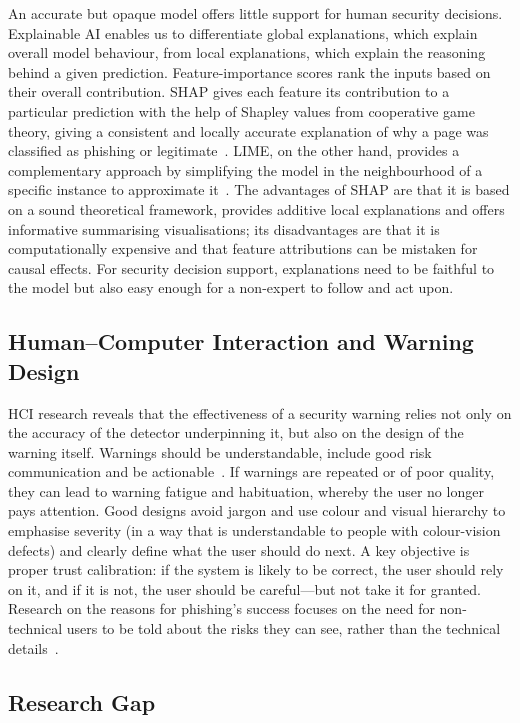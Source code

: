 \documentclass[11pt,a4paper]{article}
\begin{document}
An accurate but opaque model offers little support for human security decisions. Explainable
AI enables us to differentiate global explanations, which explain overall model behaviour,
from local explanations, which explain the reasoning behind a given prediction.
Feature-importance scores rank the inputs based on their overall contribution. SHAP gives
each feature its contribution to a particular prediction with the help of Shapley values from
cooperative game theory, giving a consistent and locally accurate explanation of why a page
was classified as phishing or legitimate~\cite{ref3}. LIME, on the other hand, provides a
complementary approach by simplifying the model in the neighbourhood of a specific instance to
approximate it~\cite{ref4}. The advantages of SHAP are that it is based on a sound theoretical
framework, provides additive local explanations and offers informative summarising
visualisations; its disadvantages are that it is computationally expensive and that feature
attributions can be mistaken for causal effects. For security decision support, explanations
need to be faithful to the model but also easy enough for a non-expert to follow and act upon.

\subsection{Human--Computer Interaction and Warning Design}

HCI research reveals that the effectiveness of a security warning relies not only on the
accuracy of the detector underpinning it, but also on the design of the warning itself.
Warnings should be understandable, include good risk communication and be
actionable~\cite{ref6,ref7}. If warnings are repeated or of poor quality, they can lead to
warning fatigue and habituation, whereby the user no longer pays attention. Good designs avoid
jargon and use colour and visual hierarchy to emphasise severity (in a way that is
understandable to people with colour-vision defects) and clearly define what the user should
do next. A key objective is proper trust calibration: if the system is likely to be correct,
the user should rely on it, and if it is not, the user should be careful---but not take it for
granted. Research on the reasons for phishing's success focuses on the need for non-technical
users to be told about the risks they can see, rather than the technical details~\cite{ref8}.

\subsection{Research Gap}
\end{document}
